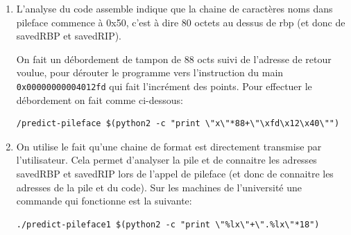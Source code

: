 \documentclass[a4paper,9pt]{article}
\theoremstyle{plain}
\theoremstyle{definition}
\begin{document}
\begin{correction}
\begin{enumerate}
\item L'analyse du code assemble indique que la chaine de caractères noms dans pileface commence à 0x50, c'est à dire 80 octets au dessus de rbp (et donc de savedRBP et savedRIP).

On fait un débordement de tampon de 88 octs suivi de l'adresse de retour voulue, pour dérouter le programme vers l'instruction du main \verb|0x00000000004012fd| qui fait l'incrément des points. Pour effectuer le débordement on fait comme ci-dessous:
\begin{verbatim}
/predict-pileface $(python2 -c "print \"x\"*88+\"\xfd\x12\x40\"")
\end{verbatim}
\item On utilise le fait qu'une chaine de format est directement transmise par l'utilisateur. 
Cela permet d'analyser la pile et de connaitre les adresses savedRBP et savedRIP lors de l'appel de pileface (et donc de connaitre les adresses de la pile et du code).
Sur les machines de l'université une commande qui fonctionne est la suivante:
\begin{verbatim}
./predict-pileface1 $(python2 -c "print \"%lx\"+\".%lx\"*18")
\end{verbatim}
\end{enumerate}
\end{correction}
\end{document}
